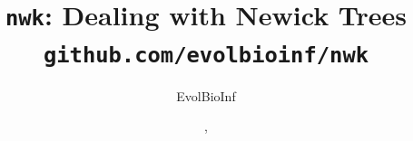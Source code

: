 \documentclass[a4paper]{article}
\begin{document}
\pagestyle{noweb}

\title{\texttt{nwk}: Dealing with Newick Trees\\
\small \texttt{github.com/evolbioinf/nwk}}
\author{EvolBioInf}
\date{\!\!, }
\maketitle
\tableofcontents





\end{document}
